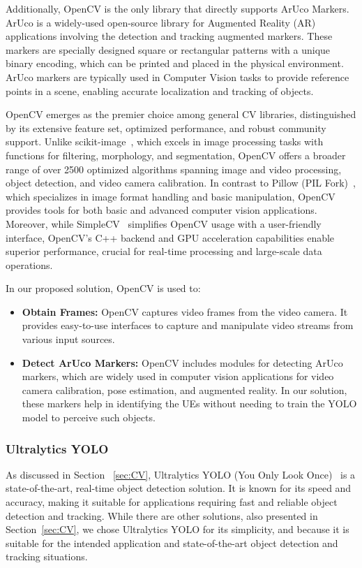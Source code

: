 Additionally, OpenCV is the only library that directly supports ArUco Markers.
ArUco is a widely-used open-source library for Augmented Reality (AR) applications involving the detection and tracking augmented markers.
These markers are specially designed square or rectangular patterns with a unique binary encoding, which can be printed and placed in the physical environment.
ArUco markers are typically used in Computer Vision tasks to provide reference points in a scene, enabling accurate localization and tracking of objects.

OpenCV emerges as the premier choice among general CV libraries, distinguished by its extensive feature set, optimized performance, and robust community support.
Unlike scikit-image~\cite{Scikit-learn}, which excels in image processing tasks with functions for filtering, morphology, and segmentation, OpenCV offers a broader range of over 2500 optimized algorithms spanning image and video processing, object detection, and video camera calibration.
In contrast to Pillow (PIL Fork)~\cite{pillow}, which specializes in image format handling and basic manipulation, OpenCV provides tools for both basic and advanced computer vision applications.
Moreover, while SimpleCV~\cite{simplecv} simplifies OpenCV usage with a user-friendly interface, OpenCV's C++ backend and GPU acceleration capabilities enable superior performance, crucial for real-time processing and large-scale data operations.

In our proposed solution, OpenCV is used to:
\begin{itemize}
    \item \textbf{Obtain Frames:} OpenCV captures video frames from the video camera.
    It provides easy-to-use interfaces to capture and manipulate video streams from various input sources.
    \item \textbf{Detect ArUco Markers:} OpenCV includes modules for detecting ArUco markers, which are widely used in computer vision applications for video camera calibration, pose estimation, and augmented reality.
    In our solution, these markers help in identifying the UEs without needing to train the YOLO model to perceive such objects.
\end{itemize}

\subsubsection{Ultralytics YOLO}
As discussed in Section ~\ref{sec:CV}, Ultralytics YOLO (You Only Look Once)~\cite{ultralytics_docs} is a state-of-the-art, real-time object detection solution.
It is known for its speed and accuracy, making it suitable for applications requiring fast and reliable object detection and tracking.
While there are other solutions, also presented in Section~\ref{sec:CV}, we chose Ultralytics YOLO for its simplicity, and because it is suitable for the intended application and state-of-the-art object detection and tracking situations.

